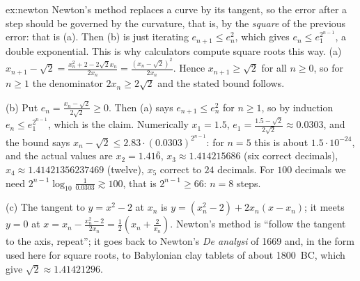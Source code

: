 \begin{solution}{ex:newton}
\idea Newton's method replaces a curve by its tangent, so the error after a step should be governed by the curvature, that is, by the \emph{square} of the previous error: that is (a). Then (b) is just iterating $e_{n+1}\le e_n^2$, which gives $e_n\le e_1^{2^{n-1}}$, a double exponential. This is why calculators compute square roots this way.
\writeup (a) $x_{n+1}-\sqrt2=\frac{x_n^2+2-2\sqrt2x_n}{2x_n}=\frac{(x_n-\sqrt2)^2}{2x_n}$. Hence $x_{n+1}\ge\sqrt2$ for all $n\ge0$, so for $n\ge1$ the denominator $2x_n\ge2\sqrt2$ and the stated bound follows.

(b) Put $e_n=\frac{x_n-\sqrt2}{2\sqrt2}\ge0$. Then (a) says $e_{n+1}\le e_n^2$ for $n\ge1$, so by induction $e_n\le e_1^{2^{n-1}}$, which is the claim. Numerically $x_1=1.5$, $e_1=\frac{1.5-\sqrt2}{2\sqrt2}\approx0.0303$, and the bound says $x_n-\sqrt2\le2.83\cdot(0.0303)^{2^{n-1}}$: for $n=5$ this is about $1.5\cdot10^{-24}$, and the actual values are $x_2=1.41\overline6$, $x_3\approx1.414215686$ (six correct decimals), $x_4\approx1.41421356237469$ (twelve), $x_5$ correct to $24$ decimals. For $100$ decimals we need $2^{n-1}\log_{10}\frac1{0.0303}\gtrsim100$, that is $2^{n-1}\ge66$: $n=8$ steps.

(c) The tangent to $y=x^2-2$ at $x_n$ is $y=(x_n^2-2)+2x_n(x-x_n)$; it meets $y=0$ at $x=x_n-\frac{x_n^2-2}{2x_n}=\frac12\left(x_n+\frac2{x_n}\right)$. Newton's method is ``follow the tangent to the axis, repeat''; it goes back to Newton's \emph{De analysi} of 1669 and, in the form used here for square roots, to Babylonian clay tablets of about 1800~BC, which give $\sqrt2\approx1.41421296$.
\end{solution}

